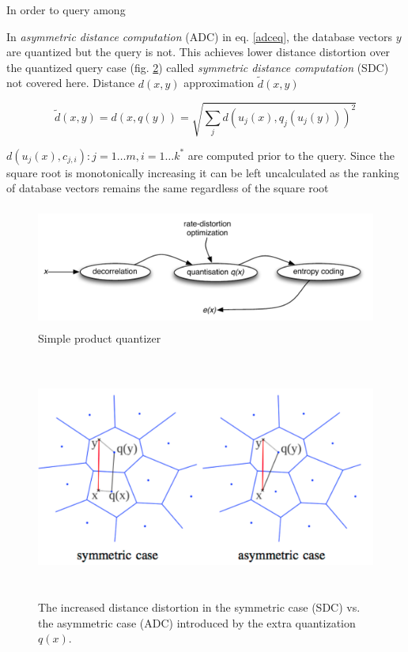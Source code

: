 \documentclass[english,12pt,a4paper,pdftex,elec,utf8]{aaltothesis}
\begin{document}
In order to query among

In \emph{asymmetric distance computation} (ADC) in eq. \ref{adceq}, the database vectors $y$ are quantized but the query is not. This achieves lower distance distortion over the quantized query case (fig. \ref{nosdc}) called \emph{symmetric distance computation} (SDC) not covered here. Distance $d(x,y)$ approximation $\tilde{d}(x,y)$

\begin{equation}
  \label{adceq}
  \tilde{d}(x,y)=d(x, q(y))=\sqrt{\sum_jd(u_j(x),q_j(u_j(y)))^2}
\end{equation}

$d(u_j(x),c_{j,i}) : j = 1\ldots m,i=1\ldots k^*$ are computed prior to the query. Since the square root is monotonically increasing it can be left uncalculated as the ranking of database vectors remains the same regardless of the square root\cite{Jegou2011}

\begin{figure}[htb]
\begin{center}
\includegraphics[height=4cm]{figures/pq}
\end{center}
\caption{Simple product quantizer \cite{Jegou2014}}
\label{pqfig}
\end{figure}

\begin{figure}[htb]
\begin{center}
\includegraphics[height=8cm]{figures/sdcadc}
\end{center}
\caption{The increased distance distortion in the symmetric case (SDC) vs. the asymmetric case (ADC) introduced by the extra quantization $q(x)$. \cite{Jegou2008}}
\label{nosdc}
\end{figure}
\end{document}
